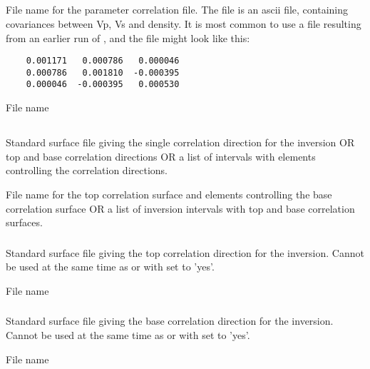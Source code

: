 \subsection{}
 \slist
   \item \Description File name for the parameter correlation file. The file is an ascii file, containing covariances between Vp, Vs and density.
   It is most common to use a file resulting from an earlier run of \crava, and the file might look like this:

  \begin{verbatim}
    0.001171   0.000786   0.000046
  	0.000786   0.001810  -0.000395
  	0.000046  -0.000395   0.000530
  \end{verbatim}
   \item \Argument File name
   \item \Default
 \elist

\subsection{}
 \slist
   \item \Description Standard surface file giving the single correlation direction for the inversion OR top and base correlation directions OR a list of intervals with elements controlling the correlation directions.
   \item \Argument File name for the top correlation surface and elements controlling the base correlation surface OR a list of inversion intervals with top and base correlation surfaces.
   \item \Default
 \elist

\subsubsection{}
 \slist
   \item \Description Standard surface file giving the top correlation direction for the inversion. Cannot be used at the same time as  or with  set to 'yes'.
   \item \Argument File name
   \item \Default
 \elist

\subsubsection{}
 \slist
   \item \Description Standard surface file giving the base correlation direction for the inversion. Cannot be used at the same time as  or with  set to 'yes'.
   \item \Argument File name
   \item \Default
 \elist
 
